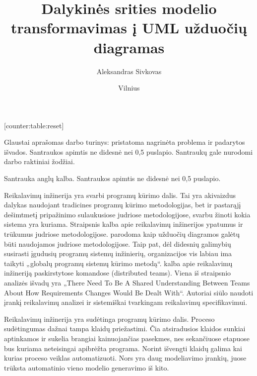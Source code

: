 \documentclass{VUMIFInfBakalaurinis}
\title{Dalykinės srities modelio transformavimas į UML užduočių diagramas}
\author{Aleksandras Sivkovas}
\date{Vilnius \\ \the\year}
\begin{document}
[counter:table:reset]
\newcommand\rownumber{\stepcounter{counter:table}\arabic{counter:table}}

\maketitle

Glaustai aprašomas darbo turinys: pristatoma nagrinėta problema ir padarytos
išvados. Santraukos apimtis ne didesnė nei 0,5 puslapio. Santraukų gale
nurodomi darbo raktiniai žodžiai.

Santrauka anglų kalba. Santraukos apimtis ne didesnė nei 0,5 puslapio.

\tableofcontents



Reikalavimų inžinerija yra svarbi programų kūrimo dalis. Tai yra akivaizdus dalykas naudojant tradicines programų kūrimo metodologijas, bet ir pastarąjį dešimtmetį pripažinimo sulaukusiose judriose metodologijose, svarbu žinoti kokia sistema yra kuriama. Straipsnis \cite{reInAgile} kalba apie reikalavimų inžinerijos ypatumus ir trūkumus judriose metodologijose. \cite{jacobson2011usecase} parodoma kaip užduočių diagramos galėtų būti naudojamos judriose metodologijose. Taip pat, dėl didesnių galimybių susirasti įgudusių programų sistemų inžinierių, organizacijos vis labiau ima taikyti „globalų programų sistemų kūrimo metodą“.  \cite{reInGlobalPrograming} kalba apie reikalavimų inžineriją paskirstytose komandose (distributed teams). Viena iš straipsnio analizės išvadų yra „There Need To Be A Shared Understanding Between Teams About How Requirements Changes Would Be Dealt With“. Autoriai siūlo naudoti įrankį reikalavimų analizei ir sistemiškai tvarkingam reikalavimų specifikavimui.

Reikalavimų inžinerija yra sudėtinga programų kūrimo dalis. Proceso sudėtingumas dažnai tampa klaidų priežastimi. Čia atsiradusios klaidos sunkiai aptinkamos ir sukelia brangiai kainuojančias pasekmes, nes sekančiuose etapuose bus kuriama neteisingai apibrėžta programa. Norint išvengti klaidų galima kai kurias proceso veiklas automatizuoti. Nors yra daug modeliavimo įrankių, juose trūksta automatinio vieno modelio generavimo iš kito.
\end{document}
